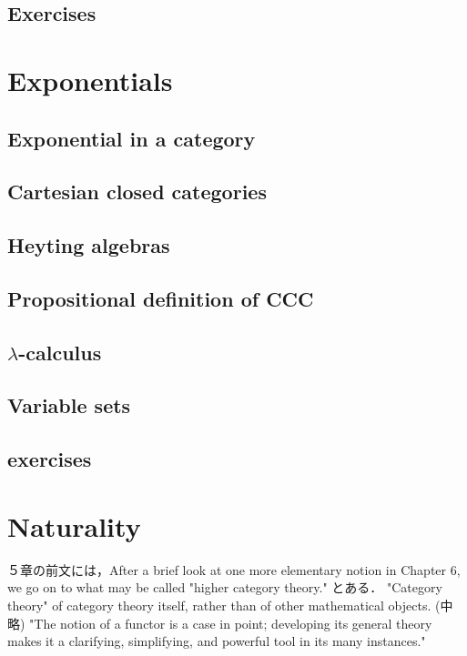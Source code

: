 \documentclass[uplatex, 12pt, dvipdfmx]{jsarticle}
\begin{document}
\subsection{Exercises}

\section{Exponentials}

\subsection{Exponential in a category}

\subsection{Cartesian closed categories}

\subsection{Heyting algebras}

\subsection{Propositional definition of CCC}

\subsection{$\lambda$-calculus}

\subsection{Variable sets}

\subsection{exercises}

\section{Naturality}
５章の前文には，After a brief look at one more elementary notion in Chapter 6, we go on to what may be called "higher category theory." とある．
"Category theory" of category theory itself, rather than of other mathematical objects. (中略) "The notion of a functor is a case in point; developing its general theory makes it a clarifying, simplifying, and powerful tool in its many instances."
\end{document}
